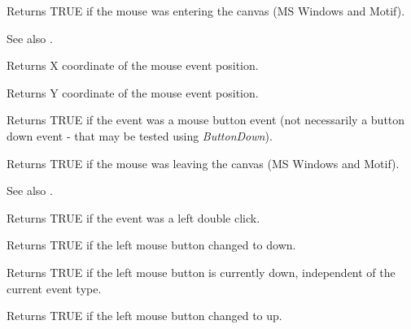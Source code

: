 
Returns TRUE if the mouse was entering the canvas (MS Windows and Motif).

See also .

\label{wxmouseeventgetx}


Returns X coordinate of the mouse event position.

\label{wxmouseeventgety}


Returns Y coordinate of the mouse event position.



Returns TRUE if the event was a mouse button event (not necessarily a button down event -
that may be tested using {\it ButtonDown}).

\label{wxmouseeventleaving}


Returns TRUE if the mouse was leaving the canvas (MS Windows and Motif).

See also .



Returns TRUE if the event was a left double click.



Returns TRUE if the left mouse button changed to down.



Returns TRUE if the left mouse button is currently down, independent
of the current event type.



Returns TRUE if the left mouse button changed to up.


